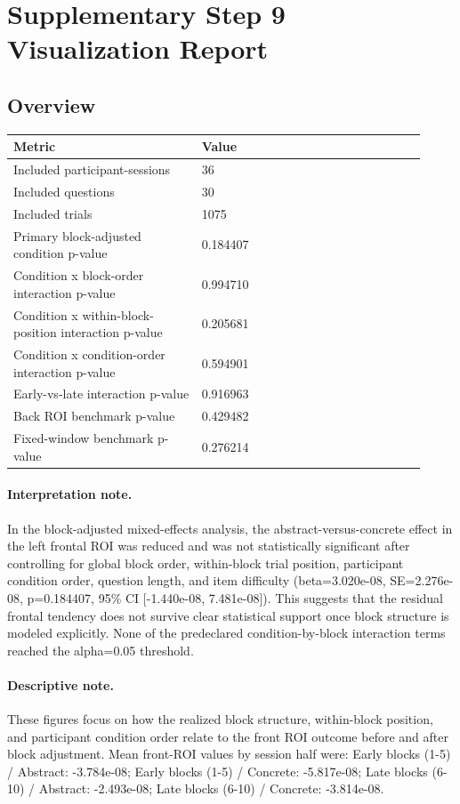 \documentclass[11pt]{article}
\begin{document}
\section*{Supplementary Step 9 Visualization Report}
\subsection*{Overview}
\begin{tabular}{p{0.42\linewidth}p{0.50\linewidth}}
\toprule
Metric & Value\\
\midrule
Included participant-sessions & 36\\
Included questions & 30\\
Included trials & 1075\\
Primary block-adjusted condition p-value & 0.184407\\
Condition x block-order interaction p-value & 0.994710\\
Condition x within-block-position interaction p-value & 0.205681\\
Condition x condition-order interaction p-value & 0.594901\\
Early-vs-late interaction p-value & 0.916963\\
Back ROI benchmark p-value & 0.429482\\
Fixed-window benchmark p-value & 0.276214\\
\bottomrule
\end{tabular}
\paragraph{Interpretation note.} In the block-adjusted mixed-effects analysis, the abstract-versus-concrete effect in the left frontal ROI was reduced and was not statistically significant after controlling for global block order, within-block trial position, participant condition order, question length, and item difficulty (beta=3.020e-08, SE=2.276e-08, p=0.184407, 95\% CI [-1.440e-08, 7.481e-08]). This suggests that the residual frontal tendency does not survive clear statistical support once block structure is modeled explicitly. None of the predeclared condition-by-block interaction terms reached the alpha=0.05 threshold.
\paragraph{Descriptive note.} These figures focus on how the realized block structure, within-block position, and participant condition order relate to the front ROI outcome before and after block adjustment. Mean front-ROI values by session half were: Early blocks (1-5) / Abstract: -3.784e-08; Early blocks (1-5) / Concrete: -5.817e-08; Late blocks (6-10) / Abstract: -2.493e-08; Late blocks (6-10) / Concrete: -3.814e-08.
\end{document}
